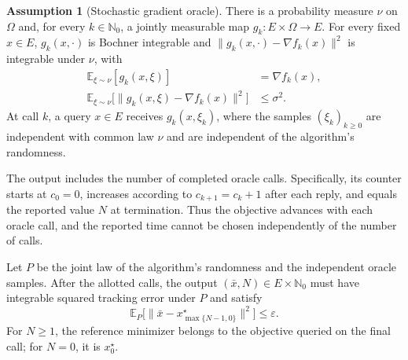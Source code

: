 \documentclass[10pt]{article}
\theoremstyle{definition}
\newtheorem{assumption}{Assumption}
\begin{document}
\begin{assumption}[Stochastic gradient oracle]
There is a probability measure $\nu$ on $\Omega$ and, for every $k\in\mathbb{N}_0$, a jointly measurable map $g_k:E\times\Omega\to E$. For every fixed $x\in E$, $g_k(x,\cdot)$ is Bochner integrable and $\|g_k(x,\cdot)-\nabla f_k(x)\|^2$ is integrable under $\nu$, with
\[
\begin{aligned}
\mathbb{E}_{\xi\sim\nu}[g_k(x,\xi)]&=\nabla f_k(x),\\
\mathbb{E}_{\xi\sim\nu}
 \bigl[\|g_k(x,\xi)-\nabla f_k(x)\|^2\bigr]&\leq\sigma^2.
\end{aligned}
\]
At call $k$, a query $x\in E$ receives $g_k(x,\xi_k)$, where the samples $(\xi_k)_{k\geq0}$ are independent with common law $\nu$ and are independent of the algorithm's randomness.
\end{assumption}

The output includes the number of completed oracle calls. Specifically, its counter starts at $c_0=0$, increases according to $c_{k+1}=c_k+1$ after each reply, and equals the reported value $N$ at termination. Thus the objective advances with each oracle call, and the reported time cannot be chosen independently of the number of calls.

Let $P$ be the joint law of the algorithm's randomness and the independent oracle samples. After the allotted calls, the output $(\bar{x},N)\in E\times\mathbb{N}_0$ must have integrable squared tracking error under $P$ and satisfy
\[
\mathbb{E}_{P}\bigl[
\|\bar{x}-x_{\max\{N-1,0\}}^\star\|^2
\bigr]\leq\varepsilon.
\]
For $N\geq1$, the reference minimizer belongs to the objective queried on the final call; for $N=0$, it is $x_0^\star$.
\end{document}
